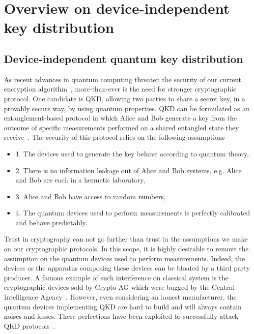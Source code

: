 \chapter{Overview on device-independent key distribution}

\section{Device-independent quantum key distribution}

As recent advances in quantum computing threaten the security of our current encryption algorithm~\cite{Gouzien2021,Gouzien2023}, more-than-ever is the need for stronger cryptographic protocol. 
One candidate is \acrfull{QKD}, allowing two parties to share a secret key, in a provably secure way, by using quantum properties.
\acrshort{QKD} can be formulated as an entanglement-based protocol in which Alice and Bob generate a key from the outcome of specific measurements performed on a shared entangled state they receive~\cite{Ekert1991}. 
The security of this protocol relies on the following assumptions
\begin{itemize}
	\item 1. The devices used to generate the key behave according to quantum theory,
	\item 2. There is no information leakage out of Alice and Bob systems, e.g. Alice and Bob are each in a hermetic laboratory,
	\item 3. Alice and Bob have access to random numbers,
	\item 4. The quantum devices used to perform measurements is perfectly calibrated and behave predictably.
\end{itemize}

Trust in cryptography can not go further than trust in the assumptions we make on our cryptographic protocols. 
In this scope, it is highly desirable to remove the assumption on the quantum devices used to perform measurements.
Indeed, the devices or the apparatus composing these devices can be bloated by a third party producer.
A famous example of such interference on classical system is the cryptographic devices sold by Crypto AG which were bugged by the Central Intelligence Agency~\cite{Miller2020}.
However, even considering an honest manufacturer, the quantum devices implementing QKD are hard to build and will always contain noises and losses.
These perfections have been exploited to successfully attack QKD protocols~\cite{Fung2007,Lydersen2010,Gerhardt2011,Weier2011}.

